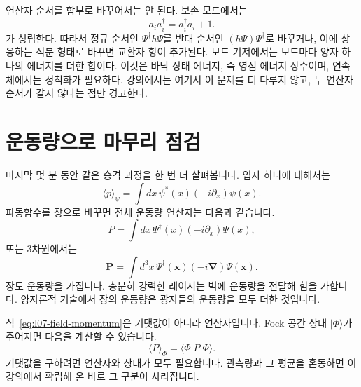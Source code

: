 연산자 순서를 함부로 바꾸어서는 안 된다. 보손 모드에서는
\begin{equation}
a_i a_i^\dagger=a_i^\dagger a_i+1.
\end{equation}
가 성립한다. 따라서 정규 순서인 \(\Psi^\dagger h\Psi\)를 반대 순서인 \((h\Psi)\Psi^\dagger\)로 바꾸거나, 이에 상응하는 적분 형태로 바꾸면 교환자 항이 추가된다. 모드 기저에서는 모드마다 양자 하나의 에너지를 더한 합이다. 이것은 바닥 상태 에너지, 즉 영점 에너지 상수이며, 연속체에서는 정칙화가 필요하다. 강의에서는 여기서 이 문제를 더 다루지 않고, 두 연산자 순서가 같지 않다는 점만 경고한다.

\begin{classroomqa}
\end{classroomqa}

\section{운동량으로 마무리 점검}

마지막 몇 분 동안 같은 승격 과정을 한 번 더 살펴봅니다. 입자 하나에 대해서는
\begin{equation}
\langle p\rangle_\psi
=\int dx\,\psi^*(x)\left(-i\partial_x\right)\psi(x).
\label{eq:l07-one-particle-momentum}
\end{equation}
파동함수를 장으로 바꾸면 전체 운동량 연산자는 다음과 같습니다.
\begin{equation}
P=\int dx\,\Psi^\dagger(x)\left(-i\partial_x\right)\Psi(x),
\label{eq:l07-field-momentum}
\end{equation}
또는 3차원에서는
\begin{equation}
\mathbf P=\int d^3x\,\Psi^\dagger(\mathbf x)
\left(-i\boldsymbol\nabla\right)\Psi(\mathbf x).
\end{equation}
장도 운동량을 가집니다. 충분히 강력한 레이저는 벽에 운동량을 전달해 힘을 가합니다. 양자론적 기술에서 장의 운동량은 광자들의 운동량을 모두 더한 것입니다.

식~\eqref{eq:l07-field-momentum}은 기댓값이 아니라 연산자입니다. Fock 공간 상태 \(|\Phi\rangle\)가 주어지면 다음을 계산할 수 있습니다.
\begin{equation}
\langle P\rangle_\Phi=\langle\Phi|P|\Phi\rangle.
\end{equation}
기댓값을 구하려면 연산자와 상태가 모두 필요합니다. 관측량과 그 평균을 혼동하면 이 강의에서 확립해 온 바로 그 구분이 사라집니다.

